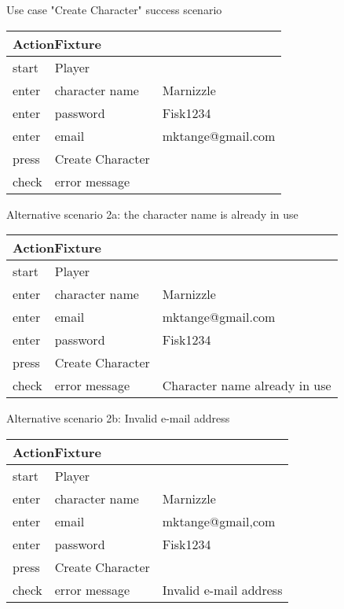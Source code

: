 
\noindent Use case "Create Character" success scenario

\vspace{0.4cm}
\begin{tabular}{| p{2cm} | p{5.5cm} | p{5.5cm} |} \hline
\multicolumn{3}{|l|}{ActionFixture} \\ \hline
start & Player &  \\ \hline
enter & character name & Marnizzle \\ \hline
enter & password & Fisk1234 \\ \hline
enter & email & mktange@gmail.com \\ \hline
press & Create Character &  \\ \hline
check & error message &  \\ \hline
\end{tabular}
\vspace{0.8cm}

\noindent Alternative scenario 2a: the character name is already in use

\vspace{0.4cm}
\begin{tabular}{| p{2cm} | p{5.5cm} | p{5.5cm} |} \hline
\multicolumn{3}{|l|}{ActionFixture} \\ \hline
start & Player &  \\ \hline
enter & character name & Marnizzle \\ \hline
enter & email & mktange@gmail.com \\ \hline
enter & password & Fisk1234 \\ \hline
press & Create Character &  \\ \hline
check & error message & Character name already in use \\ \hline
\end{tabular}
\vspace{0.8cm}

\noindent Alternative scenario 2b: Invalid e-mail address

\vspace{0.4cm}
\begin{tabular}{| p{2cm} | p{5.5cm} | p{5.5cm} |} \hline
\multicolumn{3}{|l|}{ActionFixture} \\ \hline
start & Player &  \\ \hline
enter & character name & Marnizzle \\ \hline
enter & email & mktange@gmail,com \\ \hline
enter & password & Fisk1234 \\ \hline
press & Create Character &  \\ \hline
check & error message & Invalid e-mail address \\ \hline
\end{tabular}
\vspace{0.8cm}

